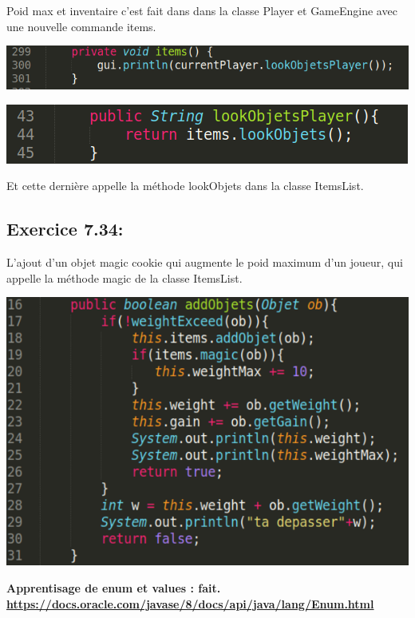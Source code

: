\documentclass[french,10pt,a4paper]{report}
\begin{document}
Poid max et inventaire c’est fait dans  dans la classe Player et  GameEngine avec une nouvelle commande items.
\begin{center}
	\includegraphics[scale=0.4]{captures/it3_7.png}
\end{center}
\begin{center}
	\includegraphics[scale=0.4]{captures/it3_8.png}
\end{center}
Et cette dernière appelle la méthode lookObjets dans la classe ItemsList.


\subsection{\textcolor{bb}{Exercice 7.34:}}
L’ajout d’un objet magic cookie qui augmente le poid maximum d’un joueur, qui appelle la méthode magic  de la classe ItemsList.
\begin{center}
	\includegraphics[scale=0.4]{captures/it3_9.png}
\end{center}
\textbf{\textcolor{gg}{Apprentisage de enum et values : fait.}}\\
\textbf{\textcolor{bb}{\href{https://docs.oracle.com/javase/8/docs/api/java/lang/Enum.html}{https://docs.oracle.com/javase/8/docs/api/java/lang/Enum.html}}}
\end{document}
